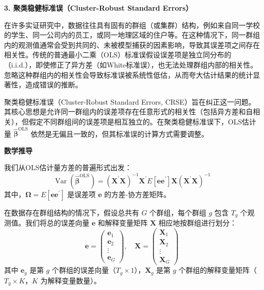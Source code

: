 \textbf{3. 聚类稳健标准误（Cluster-Robust Standard Errors）}

在许多实证研究中，数据往往具有固有的群组（或集群）结构，例如来自同一学校的学生、同一公司内的员工，或同一地理区域的住户等。在这种情况下，同一群组内的观测值通常会受到共同的、未被模型捕获的因素影响，导致其误差项之间存在相关性。传统的普通最小二乘（OLS）标准误假设误差项是独立同分布的（i.i.d.），即使修正了异方差（如White标准误），也无法处理群组内部的相关性。忽略这种群组内的相关性会导致标准误被系统性低估，从而夸大估计结果的统计显著性，造成错误的推断。

聚类稳健标准误（Cluster-Robust Standard Errors, CRSE）旨在纠正这一问题。其核心思想是允许同一群组内的误差项存在任意形式的相关性（包括异方差和自相关），但假定不同群组间的误差项是相互独立的。在聚类稳健标准误下，OLS估计量 $\hat{\pmb{\beta}}^{\text{OLS}}$ 依然是无偏且一致的，但其标准误的计算方式需要调整。

\textbf{数学推导}

我们从OLS估计量方差的普遍形式出发：
\begin{equation}
	\operatorname{Var} \left( \hat{\pmb{\beta}}^{\text{OLS}} \right) = (\pmb{X}^{\prime}\pmb{X})^{-1} \pmb{X}^{\prime} E[\pmb{e}\pmb{e}^{\prime}] \pmb{X} (\pmb{X}^{\prime}\pmb{X})^{-1}
\end{equation}
其中，$\pmb{\Omega} = E[\pmb{e}\pmb{e}^{\prime}]$ 是误差项 $\pmb{e}$ 的方差-协方差矩阵。

在数据存在群组结构的情况下，假设总共有 $G$ 个群组，每个群组 $g$ 包含 $T_g$ 个观测值。我们将总的误差向量 $\pmb{e}$ 和解释变量矩阵 $\pmb{X}$ 相应地按群组进行划分：
\begin{equation}
	\pmb{e} = \begin{pmatrix} \pmb{e}_1 \\ \pmb{e}_2 \\ \vdots \\ \pmb{e}_G \end{pmatrix}, \quad \pmb{X} = \begin{pmatrix} \pmb{X}_1 \\ \pmb{X}_2 \\ \vdots \\ \pmb{X}_G \end{pmatrix}
\end{equation}
其中 $\pmb{e}_g$ 是第 $g$ 个群组的误差向量（$T_g \times 1$），$\pmb{X}_g$ 是第 $g$ 个群组的解释变量矩阵（$T_g \times K$，$K$ 为解释变量数量）。


